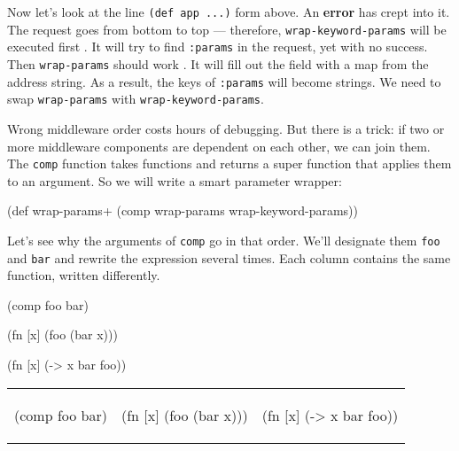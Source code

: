 

Now let's look at the line \verb|(def app ...)| form above. An \textbf{error} has crept into it. The request goes from bottom to top — therefore, \verb|wrap-keyword-params| will be executed first . It will try to find \verb|:params| in the request, yet with no success. Then \verb|wrap-params| should work . It will fill out the field with a map from the address string. As a result, the keys of \verb|:params| will become strings. We need to swap \verb|wrap-params| with \verb|wrap-keyword-params|.

Wrong middleware order costs hours of debugging. But there is a trick: if two or more middleware components are dependent on each other, we can join them. The \verb|comp| function takes functions and returns a super function that applies them to an argument. So we will write a smart parameter wrapper:


\begin{english}
\begin{clojure}
(def wrap-params+ (comp wrap-params wrap-keyword-params))
\end{clojure}
\end{english}

Let's see why the arguments of \verb|comp| go in that order. We'll designate them \verb|foo| and \verb|bar| and rewrite the expression several times. Each column contains the same function, written differently.

\ifx\devicetype\mobile

\begin{english}
\begin{clojure}
(comp foo bar)

(fn [x]
(foo (bar x)))

(fn [x] (-> x
bar
foo))
\end{clojure}
\end{english}

\else

\begin{english}

\noindent
\begin{tabular}{ @{}p{3.2cm} @{}p{3.5cm} @{}p{3.5cm} }

\begin{clojure}
(comp foo bar)
\end{clojure}

&

\begin{clojure}
(fn [x]
(foo (bar x)))
\end{clojure}

&

\begin{clojure}
(fn [x] (-> x
bar
foo))
\end{clojure}

\end{tabular}

\end{english}

